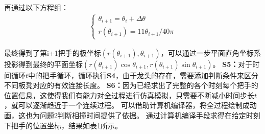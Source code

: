 \documentclass{cumcmthesis1}
\begin{document}
\par
再通过以下方程组：
\begin{align}
    \begin{cases}
        \theta_{i+1}=\theta_{i}+\Delta \theta\\
        r(\theta_{i+1})=11 \theta_{i+1}/40 \pi
    \end{cases}
\end{align}
\par
最终得到了第i+1把手的极坐标$(r(\theta_{i+1}),\theta_{i+1})$，可以通过一步平面直角坐标系投影得到最终的平面坐标$(r(\theta_{i+1}) \cos \theta_{i+1},r(\theta_{i+1}) \sin \theta_{i+1}) $。
\newline
\noindent
\textbf{S5：}对于时间循环$t$中的把手循环，循环执行\textbf{S4}，由于龙头的存在，需要添加判断条件来区分不同板凳对应的有效连接长度。
\newline
\noindent
\textbf{S6：}因为已经求出了完整的各个时刻每个把手的位置信息，这使得我们有能力对全过程进行仿真模拟，只需要不断减小时间步长$t$，就可以逐渐趋近于一个连续过程。
可以借助计算机编译器，将全过程绘制成动画，这也为问题2判断相撞时间提供了依据。
通过计算机编译手段求得在给定时刻下把手的位置坐标，结果如表1所示。
\end{document}
